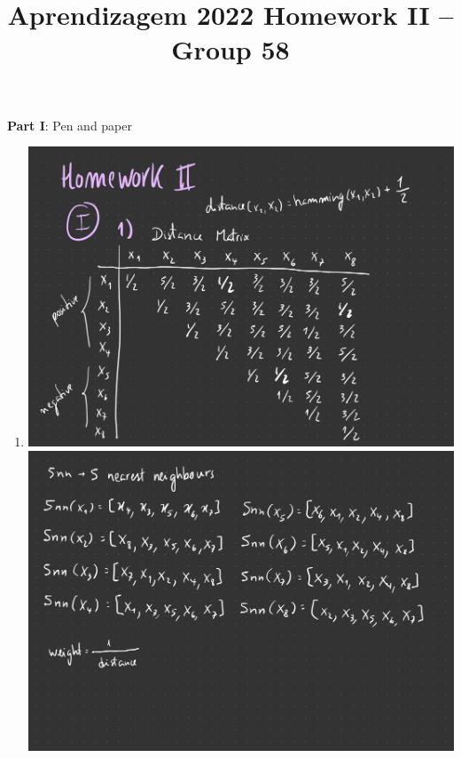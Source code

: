 \documentclass[12pt]{article}
\title{\large{Aprendizagem 2022}\vskip 0.2cm Homework II -- Group 58}
\date{}
\begin{document}
\maketitle
\center\large{\vskip -2.5cm\textbf{Part I}: Pen and paper}
\begin{enumerate}[leftmargin=\labelsep]


\item \leavevmode\vadjust{\vspace{-\baselineskip}}
\begin{center}
\includegraphics[scale=0.2]{images/Project-02.jpg}
\newline
\includegraphics[scale=0.2]{images/Project-03.jpg}
\newline

\end{center}
\end{enumerate}
\end{document}
